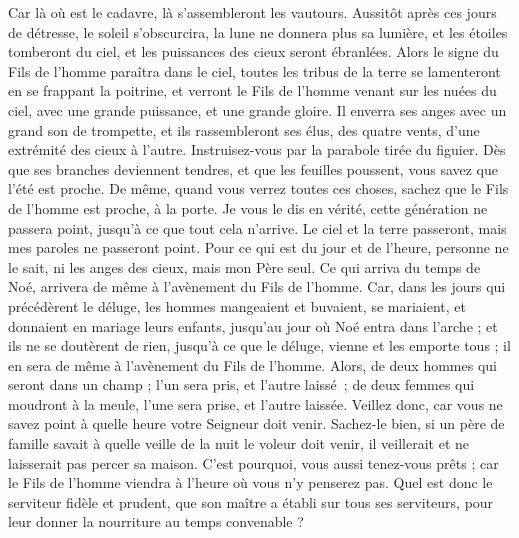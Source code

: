 \begin{multicols}{2}
{Car là où est le cadavre, là s'assembleront les vautours.
Aussitôt après ces jours de détresse, le soleil s’obscurcira, la lune ne donnera plus sa lumière, et les étoiles tomberont du ciel, et les puissances des cieux seront ébranlées.
Alors le signe du Fils de l'homme paraîtra dans le ciel, toutes les tribus de la terre se lamenteront en se frappant la poitrine, et verront le Fils de l'homme venant sur les nuées du ciel, avec une grande puissance, et une grande gloire.
Il enverra ses anges avec un grand son de trompette, et ils rassembleront ses élus, des quatre vents, d’une extrémité des cieux à l’autre.
Instruisez-vous par la parabole tirée du figuier. Dès que ses branches deviennent tendres, et que les feuilles poussent, vous savez que l'été est proche.
De même, quand vous verrez toutes ces choses, sachez que le Fils de l'homme est proche, à la porte.
Je vous le dis en vérité, cette génération ne passera point, jusqu’à ce que tout cela n’arrive.
Le ciel et la terre passeront, mais mes paroles ne passeront point.
Pour ce qui est du jour et de l’heure, personne ne le sait, ni les anges des cieux, mais mon Père seul.
Ce qui arriva du temps de Noé, arrivera de même à l'avènement du Fils de l'homme.
Car, dans les jours qui précédèrent le déluge, les hommes mangeaient et buvaient, se mariaient, et donnaient en mariage leurs enfants, jusqu'au jour où Noé entra dans l'arche ;
et ils ne se doutèrent de rien, jusqu’à ce que le déluge, vienne et les emporte tous ; il en sera de même à l'avènement du Fils de l'homme.
Alors, de deux hommes qui seront dans un champ ; l'un sera pris, et l'autre laissé ;
de deux femmes qui moudront à la meule, l'une sera prise, et l'autre laissée.
Veillez donc, car vous ne savez point à quelle heure votre Seigneur doit venir.
Sachez-le bien, si un père de famille savait à quelle veille de la nuit le voleur doit venir, il veillerait et ne laisserait pas percer sa maison.
C'est pourquoi, vous aussi tenez-vous prêts ; car le Fils de l'homme viendra à l'heure où vous n'y penserez pas.
Quel est donc le serviteur fidèle et prudent, que son maître a établi sur tous ses serviteurs, pour leur donner la nourriture au temps convenable ?
}
\end{multicols}
